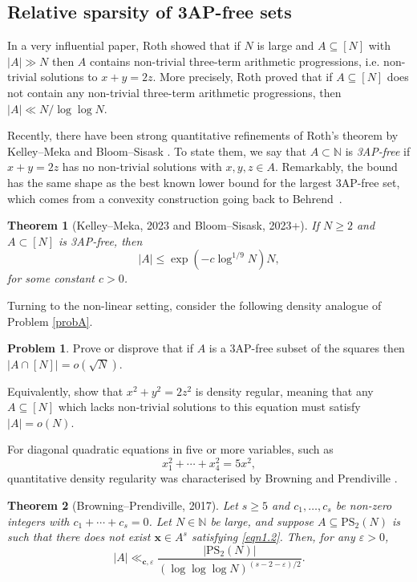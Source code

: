 \documentclass[12pt, reqno]{amsart}
\newtheorem{thm}{Theorem}[section]
\theoremstyle{definition}
\theoremstyle{remark}
\numberwithin{equation}{section}
\theoremstyle{definition}
\newtheorem{prob}{Problem}
\def\eps{\varepsilon}
\def\le{\leqslant} \def\ge{\geqslant} \def\pleq{\preccurlyeq} \def\ple{\prec}
\def \bN {\mathbb N}
\def \bc {\mathbf c}
\def \bx {\mathbf x}
\def \PS {\mathrm{PS}}
\begin{document}
\subsection{Relative sparsity of 3AP-free sets}

In a very influential paper, Roth \cite{Rot1953} showed that if $N$ is large and $A \subseteq [N]$ with $|A| \gg N$ then $A$ contains non-trivial three-term arithmetic progressions, i.e. non-trivial solutions to
$x + y = 2z$. More precisely, Roth proved that if $A\subseteq [N]$ does not contain any non-trivial three-term arithmetic progressions, then $|A| \ll N/\log\log N$.

Recently, there have been strong quantitative refinements of Roth's theorem by Kelley--Meka \cite{KM2023} and Bloom--Sisask \cite{BS}. To state them, we say that $A \subset \bN$ is \emph{3AP-free} if $x + y = 2z$ has no non-trivial solutions with $x,y,z \in A$. Remarkably, the bound has the same shape as the best known lower bound for the largest 3AP-free set, which comes from a convexity construction going back to Behrend~\cite{Beh1946}.

\begin{thm}
[Kelley--Meka, 2023 and Bloom--Sisask, 2023+] If \mbox{$N \ge 2$} and $A \subset [N]$ is 3AP-free, then
\[
|A| \le \exp(-c \log^{1/9} N) N,
\]
for some constant $c > 0$.
\end{thm}

Turning to the non-linear setting, consider the following density analogue of Problem \ref{probA}.

\begin{prob}
\label{probC}
Prove or disprove that if $A$ is a 3AP-free subset of the squares then $|A \cap [N]| = o(\sqrt N)$.
\end{prob}

\noindent
Equivalently, show that
$
x^2 + y^2 = 2z^2
$
is density regular, meaning that any $A\subseteq[N]$ which lacks non-trivial solutions to this equation must satisfy $|A|=o(N)$.

For diagonal quadratic equations in five or more variables, such as
\[
x_1^2 + \cdots + x_4^2 = 5x^2,
\]
quantitative density regularity was characterised by Browning and Prendiville \cite{BP2017}. 

\begin{thm}[Browning--Prendiville, 2017]\label{thm1.7}
Let $s \ge 5$ and $c_1, \ldots, c_s$ be non-zero integers with $c_1 + \cdots + c_s = 0$.
Let $N \in \bN$ be large,
and suppose $A \subseteq \PS_2(N)$ is such that there does not exist $\bx\in A^s$ satisfying \eqref{eqn1.2}. Then, for any $\eps>0$,
\begin{equation*}
|A|\ll_{\bc,\eps} \frac{|\PS_2(N)|}{(\log\log\log N)^{(s - 2 -\eps)/2}}.
\end{equation*}
\end{thm}
\end{document}
